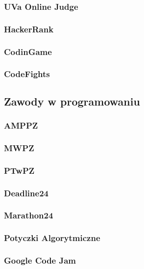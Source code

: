 \subsubsection{UVa Online Judge}

\subsubsection{HackerRank}

\subsubsection{CodinGame}

\subsubsection{CodeFights}


\subsection{Zawody w programowaniu}

\subsubsection{AMPPZ}

\subsubsection{MWPZ}

\subsubsection{PTwPZ}

\subsubsection{Deadline24}

\subsubsection{Marathon24}

\subsubsection{Potyczki Algorytmiczne}

\subsubsection{Google Code Jam}

